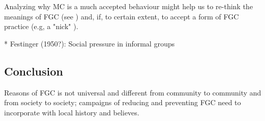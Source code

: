 \documentclass[12pt,]{article}
\begin{document}
Analyzing why MC is a much accepted behaviour might help us to re-think the meanings of FGC (see \cite{DarbSvob07}) and, if, to certain extent, to accept a form of FGC practice (e.g, a "nick" \cite{Wade11}).



 * Festinger (1950?):  Social pressure in informal groups



\subsection{Conclusion}\label{Conclusion}

Reasons of FGC is not universal and different from community to community and from society to society; campaigns of reducing and preventing FGC need to incorporate with local history and believes.
\end{document}
